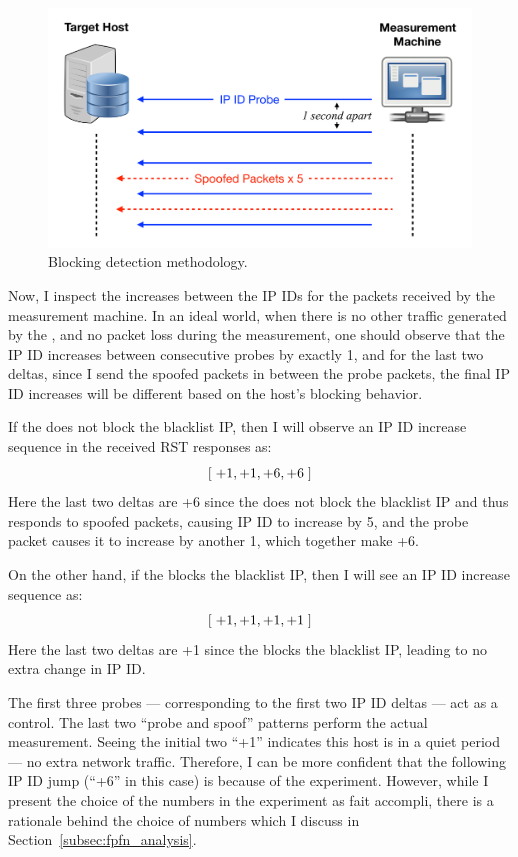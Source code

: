 \begin{figure}[t]
\centering
\includegraphics[width=0.85\columnwidth]{data_usage/images/croped_design_implementation.pdf}
\caption{Blocking detection methodology.}
\label{fig:design_implementation}
\end{figure}

Now, I inspect the increases between the IP IDs for the packets received by the
measurement machine. In an ideal world, when there is no other traffic
generated by the {}, and no packet loss during the measurement, one
should observe that the IP ID increases between consecutive probes by exactly
1, and for the last two deltas, since I send the spoofed packets in between
the probe packets, the final IP ID increases will be different based on the
host's blocking behavior.

If the {} does not block the blacklist IP, then
I will observe an IP ID increase sequence in the received RST responses as:
\[[\hspace{0.1cm} +1, +1, +6, +6 \hspace{0.1cm}]\]
Here the last two deltas are +6 since the {} does not block the
blacklist IP and thus responds to spoofed packets, causing IP ID to increase by
5, and the probe packet causes it to increase by another 1, which together make +6.

On the other hand, if the {} blocks the blacklist IP, then I will see an IP
ID increase sequence as:
\[ [\hspace{0.1cm} +1, +1, +1, +1 \hspace{0.1cm}] \]
Here the last two deltas are +1 since the {} blocks the blacklist IP,
leading to no extra change in IP ID.

The first three probes --- corresponding to the first two IP ID deltas --- act as a
control. The last two ``probe and spoof'' patterns perform the actual measurement.
Seeing the initial two ``+1'' indicates this host is in a quiet period --- no
extra network traffic. Therefore, I can be more confident that the following
IP ID jump (``+6'' in this case) is because of the experiment. However,
while I present the choice of the numbers in the experiment as fait accompli,
there is a rationale behind the choice of numbers which I discuss in Section~\ref{subsec:fpfn_analysis}.

